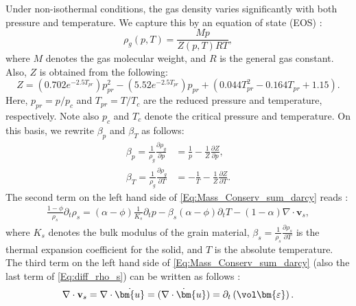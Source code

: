 Under non-isothermal conditions, the gas density varies significantly with both pressure and temperature. We {capture} this by an equation of state (EOS) \cite{mahmoud2014development}:
\begin{equation} \label{Eq:EOS}
\rho_g\left( p,T\right)  =\frac{Mp}{Z\left( p,T\right) RT},
\end{equation}
where $M$ denotes the gas molecular weight, and $R$ is the general gas constant. Also, $Z$ is obtained from the following:
\begin{equation*} \label{Eq:Z_EOS}
Z=\left(0.702e^{-2.5T_{pr}} \right) p_{pr}^2 -\left(5.52e^{-2.5T_{pr}} \right) p_{pr}+\left(0.044 T_{pr}^2 -0.164T_{pr} +1.15\right).
\end{equation*}
Here, $p_{pr}=p/p_c$ and $T_{pr}=T/T_c$ are the reduced pressure and temperature, respectively. Note also $p_c$ and $T_c$ denote the critical pressure and temperature.
On this basis, we rewrite $\beta_p$ and $\beta_T$ as follows:
\begin{equation} \label{Eq:partial_density_p_T}
\begin{aligned}
\beta_p=\frac{1}{\rho_g}\frac{\partial \rho_g}{\partial p} &= \frac{1}{p}- \frac{1}{Z} \frac{\partial Z}{\partial p}, \\
\beta_T= \frac{1}{\rho_g}\frac{\partial \rho_g}{\partial T} &= -\frac{1}{T}- \frac{1}{Z} \frac{\partial Z}{\partial T}.
\end{aligned}
\end{equation}
The second term on the left hand side of \eqref{Eq:Mass_Conserv_sum_darcy} reads \cite{lewis1998finite}: %
\begin{equation}\label{Eq:diff_rho_s}
\begin{aligned}
\frac{1-\phi}{\rho_s} \partial_t\rho_s= \left(\alpha-\phi \right) \frac{1}{K_s} \partial_t p -\beta_s\left(\alpha-\phi \right) \partial_t T - \left(1-\alpha \right)  \nabla \cdot \mathbf{v}_s,
\end{aligned}
\end{equation}
where {$K_s$ denotes the bulk modulus of the grain material}, $\beta_s=\frac{1}{\rho_s}\frac{\partial\rho_s}{\partial T}$ is the thermal expansion coefficient for the solid, and $T$ is the absolute temperature.
The third term on the left hand side of \eqref{Eq:Mass_Conserv_sum_darcy} (also the last term of \eqref{Eq:diff_rho_s}) can be written as follows \cite{merxhani2016introduction}:
\begin{equation} \label{Eq:solid velocity}
\begin{aligned}
\nabla \cdot \mathbf{v}_s=\nabla \cdot \dot{\bm{u}}= \dot{\left( \nabla \cdot \bm{u}\right)}=\partial_t\left(\vol\bm{\varepsilon}\right).
\end{aligned}
\end{equation}
